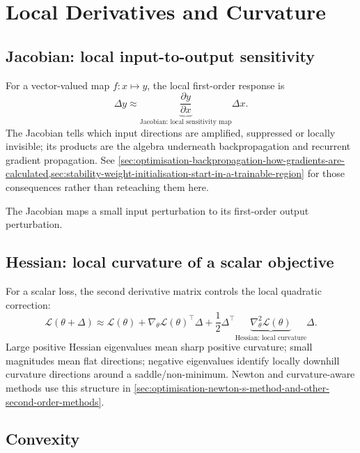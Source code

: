 \section{Local Derivatives and Curvature}
\label{sec:la-multivariable-calculus-and-optimisation}

\subsection{Jacobian: local input-to-output sensitivity}
\label{subsec:la-jacobian}

For a vector-valued map $f:x\mapsto y$, the local first-order response is
\[
\Delta y
\approx
\underbrace{\frac{\partial y}{\partial x}}_{\text{Jacobian: local sensitivity map}}\Delta x.
\]
The Jacobian tells which input directions are amplified, suppressed or locally invisible; its products are the algebra underneath backpropagation and recurrent gradient propagation.
See \cref{sec:optimisation-backpropagation-how-gradients-are-calculated,sec:stability-weight-initialisation-start-in-a-trainable-region} for those consequences rather than reteaching them here.

\begin{calloutmemoryhook}
The Jacobian maps a small input perturbation to its first-order output perturbation.
\end{calloutmemoryhook}

\subsection{Hessian: local curvature of a scalar objective}
\label{subsec:la-hessian}

For a scalar loss, the second derivative matrix controls the local quadratic correction:
\[
\mathcal L(\theta+\Delta)
\approx
\mathcal L(\theta)
+
\nabla_\theta\mathcal L(\theta)^\top\Delta
+
\frac12\Delta^\top
\underbrace{\nabla_\theta^2\mathcal L(\theta)}_{\text{Hessian: local curvature}}\Delta.
\]
Large positive Hessian eigenvalues mean sharp positive curvature; small magnitudes mean flat directions; negative eigenvalues identify locally downhill curvature directions around a saddle/non-minimum.
Newton and curvature-aware methods use this structure in \cref{sec:optimisation-newton-s-method-and-other-second-order-methods}.

\subsection{Convexity}
\label{sec:foundations-convexity-and-why-it-matters-for-optimisation}

